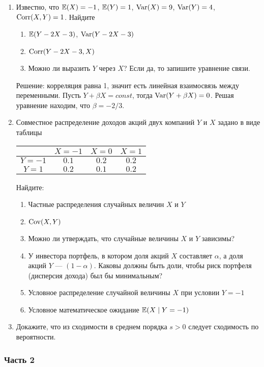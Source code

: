 \begin{enumerate}
\item Известно, что  $\mathbb{E}(X)=-1$, $\mathbb{E}(Y)=1$, $\operatorname{Var}(X)=9$, $\operatorname{Var}(Y)=4$, $\operatorname{Corr}(X,Y)=1$. Найдите
\begin{enumerate}
\item $\mathbb{E}(Y-2X-3)$, $\operatorname{Var}(Y-2X-3)$
\item  $\operatorname{Corr}(Y-2X-3,X)$
\item Можно ли выразить $Y$ через $X$? Если да, то запишите уравнение связи.
\end{enumerate}

Решение: корреляция равна 1, значит есть линейная взаимосвязь между переменными. Пусть $Y+\beta X=const$, тогда $\operatorname{Var}(Y+\beta X)=0$. Решая уравнение находим, что $\beta=-2/3$.

\item Совместное распределение доходов акций двух компаний $Y$ и $X$ задано в виде таблицы

\begin{tabular}{c|ccc}
 & $X=-1$ & $X=0$ & $X=1$ \\
\hline
$Y=-1$ & $0.1$ & $0.2$ & $0.2$ \\
$Y=1$ & $0.2$ & $0.1$ & $0.2$ \\
\end{tabular}

Найдите:
\begin{enumerate}
\item Частные распределения случайных величин $X$ и $Y$
\item $\operatorname{Cov}(X,Y)$
\item Можно ли утверждать, что случайные величины $X$ и $Y$ зависимы?
\item У инвестора портфель, в котором доля акций $X$ составляет $
\alpha$, а доля акций $Y$ — $(1-\alpha)$. Каковы должны быть доли, чтобы риск портфеля (дисперсия дохода) был бы минимальным?
\item Условное распределение случайной величины $X$ при условии $Y=-1$
\item Условное математическое ожидание $\mathbb{E}(X\mid Y=-1)$
\end{enumerate}

\item Докажите, что из сходимости в среднем порядка $s>0$ следует сходимость по вероятности.

\end{enumerate}


\subsubsection*{Часть 2}

